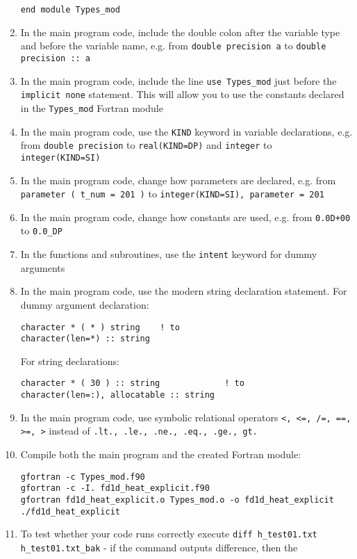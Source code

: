 \documentclass[12pt]{article}
\begin{document}
\begin{enumerate}
\begin{verbatim}
end module Types_mod
\end{verbatim}
\item In the main program code, include the double colon after the variable type and before 
the variable name, e.g. from \texttt{double precision a} to \texttt{double precision :: a}
\item In the main program code, include the line \texttt{use Types\_mod} just before
the \texttt{implicit none} statement. This will allow you to use the constants declared in the
\texttt{Types\_mod} Fortran module
\item In the main program code, use the \texttt{KIND} keyword in variable declarations, e.g.
from \texttt{double precision} to \texttt{real(KIND=DP)} and \texttt{integer} to 
\texttt{integer(KIND=SI)}
\item In the main program code, change how parameters are declared, e.g. from 
\texttt{parameter ( t\_num = 201 )} to \texttt{integer(KIND=SI), parameter = 201}
\item In the main program code, change how constants are used, e.g. from \texttt{0.0D+00} to 
\texttt{0.0\_DP}
\item In the functions and subroutines, use the \texttt{intent} keyword for dummy arguments
\item In the main program code, use the modern string declaration statement. For dummy argument
declaration:
\begin{verbatim}
character * ( * ) string    ! to
character(len=*) :: string
\end{verbatim}
For string declarations:
\begin{verbatim}
character * ( 30 ) :: string             ! to
character(len=:), allocatable :: string
\end{verbatim}
\item In the main program code, use symbolic relational operators \texttt{<, <=, /=, ==, >=, >}
instead of \texttt{.lt., .le., .ne., .eq., .ge., gt.}
\item Compile both the main program and the created Fortran module:
\begin{verbatim}
gfortran -c Types_mod.f90
gfortran -c -I. fd1d_heat_explicit.f90
gfortran fd1d_heat_explicit.o Types_mod.o -o fd1d_heat_explicit
./fd1d_heat_explicit
\end{verbatim}
\item To test whether your code runs correctly execute\newline 
\texttt{diff h\_test01.txt h\_test01.txt\_bak} - if the command outputs difference, then the 

\end{enumerate}
\end{document}
